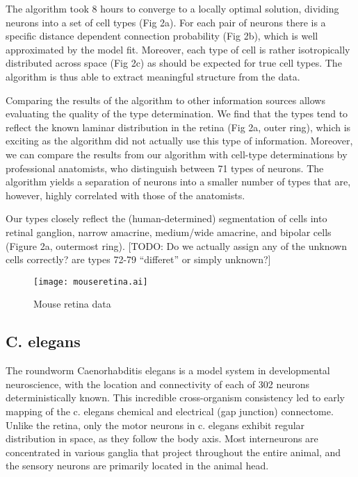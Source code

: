 \documentclass{nature}
\begin{document}
The algorithm took 8 hours to converge to a locally optimal solution,
dividing neurons into a set of cell types (Fig 2a). For each pair of
neurons there is a specific distance dependent connection probability
(Fig 2b), which is well approximated by the model fit. Moreover, each
type of cell is rather isotropically distributed across space (Fig 2c)
as should be expected for true cell types. The algorithm is thus able
to extract meaningful structure from the data.

Comparing the results of the algorithm to other information sources
allows evaluating the quality of the type determination. We find that
the types tend to reflect the known laminar distribution in the retina
(Fig 2a, outer ring), which is exciting as the algorithm did not
actually use this type of information. Moreover, we can compare the
results from our algorithm with cell-type determinations by
professional anatomists, who distinguish between 71 types of
neurons. The algorithm yields a separation of neurons into a smaller
number of types that are, however, highly correlated with those of the
anatomists.

Our types closely reflect the (human-determined) segmentation of cells
into retinal ganglion, narrow amacrine, medium/wide amacrine, and
bipolar cells (Figure 2a, outermost ring). [TODO: Do we actually
assign any of the unknown cells correctly? are types 72-79 “differet”
or simply unknown?]





\begin{figure}
  \centering 
  \centerline{\texttt{[image: mouseretina.ai]}}
  \caption{Mouse retina data}
\end{figure}

\subsection{C. elegans}

The roundworm Caenorhabditis elegans is a model system in
developmental neuroscience, with the location and connectivity of each
of 302 neurons deterministically known. This incredible cross-organism
consistency led to early mapping of the c. elegans chemical and
electrical (gap junction) connectome. Unlike the retina, only the
motor neurons in c. elegans exhibit regular distribution in space, as
they follow the body axis. Most interneurons are concentrated in
various ganglia that project throughout the entire animal, and the
sensory neurons are primarily located in the animal head.
\end{document}
